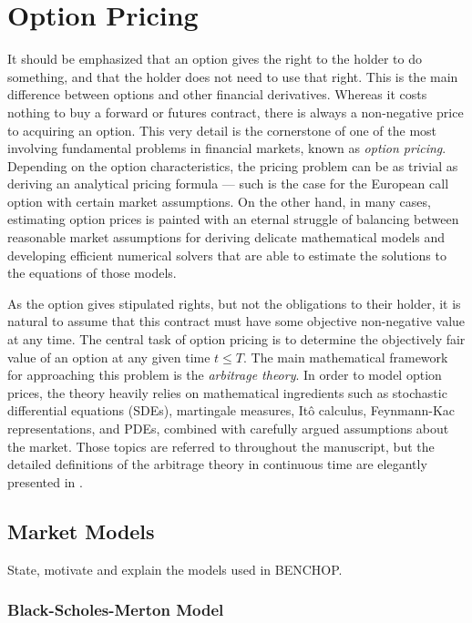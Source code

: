 \documentclass{UUThesisTemplate}
\begin{document}
\chapter{Option Pricing}
\label{ch:optionpricing}
\par It should be emphasized that an option gives the right to the holder to do something, and that the holder does not need to use that right. This is the main difference between options and other financial derivatives. Whereas it costs nothing to buy a forward or futures contract, there is always a non-negative price to acquiring an option. This very detail is the cornerstone of one of the most involving fundamental problems in financial markets, known as \emph{option pricing}. Depending on the option characteristics, the pricing problem can be as trivial as deriving an analytical pricing formula --- such is the case for the European call option with certain market assumptions. On the other hand, in many cases, estimating option prices is painted with an eternal struggle of balancing between reasonable market assumptions for deriving delicate mathematical models and developing efficient numerical solvers that are able to estimate the solutions to the equations of those models.
\par As the option gives stipulated rights, but not the obligations to their holder, it is natural to assume that this contract must have some objective non-negative value at any time. The central task of option pricing is to determine the objectively fair value of an option at any given time $t \leq T$. The main mathematical framework for approaching this problem is the \emph{arbitrage theory}. In order to model option prices, the theory heavily relies on mathematical ingredients such as stochastic differential equations (SDEs), martingale measures, It\^o calculus, Feynmann-Kac representations, and PDEs, combined with carefully argued assumptions about the market. Those topics are referred to throughout the manuscript, but the detailed definitions of the arbitrage theory in continuous time are elegantly presented in \cite{bjork2009arbitrage}.
%
\section{Market Models}
\label{sec:models}
\par \noindent {\color{red}\rule{\textwidth}{2pt}}

State, motivate and explain the models used in BENCHOP.

\subsection{Black-Scholes-Merton Model}
\end{document}
